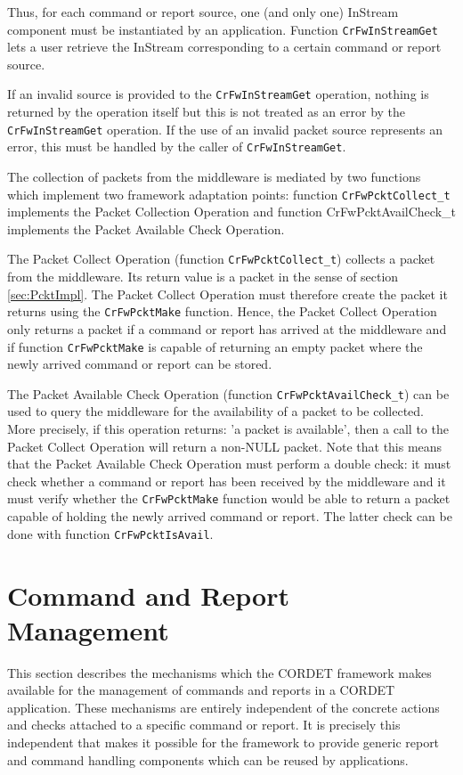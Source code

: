 \documentclass[a4paper,10pt]{article}
\let\stdsection\section
\renewcommand\section{\newpage\stdsection}
\begin{document}
Thus, for each command or report source, one (and only one) InStream component must be instantiated by an application. Function \texttt{CrFwInStreamGet} lets a user retrieve the InStream corresponding to a certain command or report source. 

If an invalid source is provided to the \texttt{CrFwInStreamGet} operation, nothing is returned by the operation itself but this is not treated as an error by the \texttt{CrFwInStreamGet} operation. If the use of an invalid packet source represents an error, this must be handled by the caller of \texttt{CrFwInStreamGet}.

The collection of packets from the middleware is mediated by two functions which implement two framework adaptation points: function \texttt{CrFwPcktCollect\_t} implements the Packet Collection Operation and function CrFwPcktAvailCheck\_t implements the Packet Available Check Operation. 

The Packet Collect Operation (function \texttt{CrFwPcktCollect\_t}) collects a packet from the middleware. Its return value is a packet in the sense of section \ref{sec:PcktImpl}. The Packet Collect Operation must therefore create the packet it returns using the \texttt{CrFwPcktMake} function. Hence, the Packet Collect Operation only returns a packet if a command or report has arrived at the middleware and if function \texttt{CrFwPcktMake} is capable of returning an empty packet where the newly arrived command or report can be stored. 

The Packet Available Check Operation (function \texttt{CrFwPcktAvailCheck\_t}) can be used to query the middleware for the availability of a packet to be collected. More precisely, if this operation returns: 'a packet is available', then a call to the Packet Collect Operation will return a non-NULL packet. Note that this means that the Packet Available Check Operation must perform a double check: it must check whether a command or report has been received by the middleware and it must verify whether the \texttt{CrFwPcktMake} function would be able to return a packet capable of holding the newly arrived command or report. The latter check can be done with function \texttt{CrFwPcktIsAvail}.


\section{Command and Report Management}\label{sec:CmdAndRepManagement}
This section describes the mechanisms which the CORDET framework makes available for the management of commands and reports in a CORDET application. These mechanisms are entirely independent of the concrete actions and checks attached to a specific command or report. It is precisely this independent that makes it possible for the framework to provide generic report and command handling components which can be reused by applications.
\end{document}
